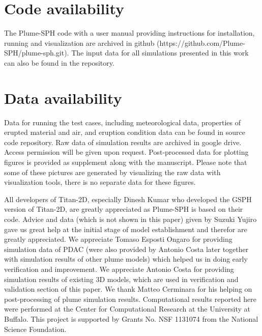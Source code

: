 \documentclass[journal abbreviation, manuscript]{copernicus}
\begin{document}
\section{Code availability}
The Plume-SPH code with a user manual providing instructions for installation, running and visualization are archived in github (https://github.com/Plume-SPH/plume-sph.git). The input data for all simulations presented in this work can also be found in the repository.
\section{Data availability}
Data for running the test cases, including meteorological data, properties of erupted material and air, and eruption condition data can be found in source code repository. Raw data of simulation results are archived in google drive. Access permission will be given upon request. Post-processed data for plotting figures is provided as supplement along with the manuscript. Please note that some of these pictures are generated by visualizing the raw data with visualization tools, there is no separate data for these figures.
%
%
%
\begin{acknowledgements}
All developers of Titan-2D, especially Dinesh Kumar who developed the GSPH version of Titan-2D, are greatly appreciated as Plume-SPH is based on their code. Advice and data (which is not shown in this paper) given by Suzuki Yujiro gave us great help at the initial stage of model establishment and therefor are greatly appreciated. We appreciate Tomaso Esposti Ongaro for providing simulation data of PDAC (were also provided by Antonio Costa later together with simulation results of other plume models) which helped us in doing early verification and improvement. We appreciate Antonio Costa for providing simulation results of existing 3D models, which are used in verification and validation section of this paper. We thank Matteo Cerminara for his helping on post-processing of plume simulation results. Computational results reported here were performed at the Center for Computational Research at the University at Buffalo. This project is supported by Grants No. NSF 1131074 from the National Science Foundation.
\end{acknowledgements}
\end{document}
